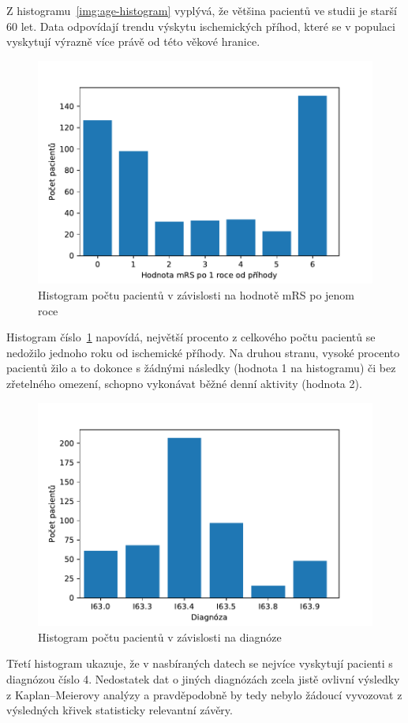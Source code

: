 Z histogramu~\ref{img:age-histogram} vyplývá, že většina pacientů ve studii je starší 60 let.
Data odpovídají trendu výskytu ischemických příhod, které se v populaci vyskytují výrazně více právě od této věkové hranice.

\begin{figure}[htbp]
    \includegraphics[width=.6\textwidth]{img/image_1.pdf}
    \centering
    \caption{Histogram počtu pacientů v závislosti na hodnotě mRS po jenom roce}
    \label{img:mrs-histogram}
\end{figure}
\FloatBarrier

Histogram číslo~\ref{img:mrs-histogram} napovídá, největší procento z celkového počtu pacientů se nedožilo jednoho roku od ischemické příhody.
Na druhou stranu, vysoké procento pacientů žilo a to dokonce s žádnými následky (hodnota 1 na histogramu) či bez zřetelného omezení, schopno vykonávat běžné denní aktivity (hodnota 2).

\begin{figure}[htbp]
    \includegraphics[width=.6\textwidth]{img/image_2.pdf}
    \centering
    \caption{Histogram počtu pacientů v závislosti na diagnóze}
\end{figure}
\FloatBarrier

Třetí histogram ukazuje, že v nasbíraných datech se nejvíce vyskytují pacienti s diagnózou číslo 4.
Nedostatek dat o jiných diagnózách zcela jistě ovlivní výsledky z Kaplan–Meierovy analýzy a pravděpodobně by tedy nebylo žádoucí vyvozovat z výsledných křivek statisticky relevantní závěry.

